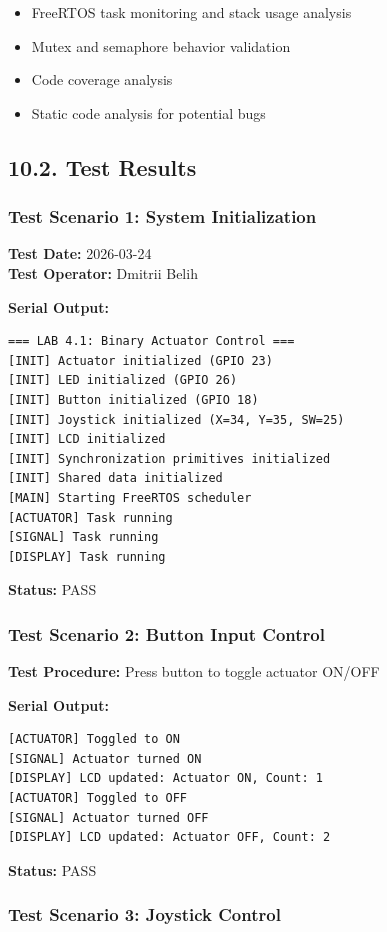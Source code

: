 \documentclass[12pt]{article}
\begin{document}
\begin{itemize}
    \item FreeRTOS task monitoring and stack usage analysis
    \item Mutex and semaphore behavior validation
    \item Code coverage analysis
    \item Static code analysis for potential bugs
\end{itemize}

\subsection*{10.2. Test Results}

\subsubsection*{Test Scenario 1: System Initialization}

\textbf{Test Date:} 2026-03-24 \\
\textbf{Test Operator:} Dmitrii Belih

\textbf{Serial Output:}
\begin{verbatim}
=== LAB 4.1: Binary Actuator Control ===
[INIT] Actuator initialized (GPIO 23)
[INIT] LED initialized (GPIO 26)
[INIT] Button initialized (GPIO 18)
[INIT] Joystick initialized (X=34, Y=35, SW=25)
[INIT] LCD initialized
[INIT] Synchronization primitives initialized
[INIT] Shared data initialized
[MAIN] Starting FreeRTOS scheduler
[ACTUATOR] Task running
[SIGNAL] Task running
[DISPLAY] Task running
\end{verbatim}

\textbf{Status:} PASS

\subsubsection*{Test Scenario 2: Button Input Control}

\textbf{Test Procedure:} Press button to toggle actuator ON/OFF

\textbf{Serial Output:}
\begin{verbatim}
[ACTUATOR] Toggled to ON
[SIGNAL] Actuator turned ON
[DISPLAY] LCD updated: Actuator ON, Count: 1
[ACTUATOR] Toggled to OFF
[SIGNAL] Actuator turned OFF
[DISPLAY] LCD updated: Actuator OFF, Count: 2
\end{verbatim}

\textbf{Status:} PASS

\subsubsection*{Test Scenario 3: Joystick Control}
\end{document}

